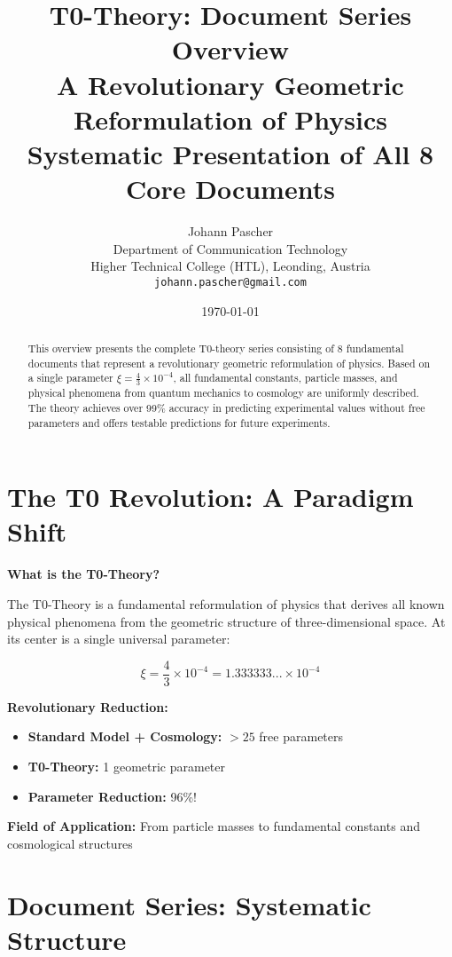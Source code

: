 \documentclass[12pt,a4paper]{article}
\title{\textbf{T0-Theory: Document Series Overview}\\[0.5cm]
	\large A Revolutionary Geometric Reformulation of Physics\\[0.3cm]
	\normalsize Systematic Presentation of All 8 Core Documents}
\author{Johann Pascher\\
	Department of Communication Technology\\
	Higher Technical College (HTL), Leonding, Austria\\
	\texttt{johann.pascher@gmail.com}}
\date{\today}
\newcommand{\xipar}{\xi}
\begin{document}
	
	\maketitle
	
	\begin{abstract}
		This overview presents the complete T0-theory series consisting of 8 fundamental documents that represent a revolutionary geometric reformulation of physics. Based on a single parameter $\xipar = \frac{4}{3} \times 10^{-4}$, all fundamental constants, particle masses, and physical phenomena from quantum mechanics to cosmology are uniformly described. The theory achieves over 99\% accuracy in predicting experimental values without free parameters and offers testable predictions for future experiments.
	\end{abstract}
	
	\tableofcontents
	\newpage
	
	\section{The T0 Revolution: A Paradigm Shift}
	
	\begin{overview}
		\textbf{What is the T0-Theory?}
		
		The T0-Theory is a fundamental reformulation of physics that derives all known physical phenomena from the geometric structure of three-dimensional space. At its center is a single universal parameter:
		
		\begin{equation}
			\boxed{\xipar = \frac{4}{3} \times 10^{-4} = 1.333333... \times 10^{-4}}
		\end{equation}
		
		\textbf{Revolutionary Reduction:}
		\begin{itemize}
			\item \textbf{Standard Model + Cosmology:} $>25$ free parameters
			\item \textbf{T0-Theory:} 1 geometric parameter
			\item \textbf{Parameter Reduction:} 96\%!
		\end{itemize}
		
		\textbf{Field of Application:} From particle masses to fundamental constants and cosmological structures
	\end{overview}
	
	\section{Document Series: Systematic Structure}
	
\end{document}
